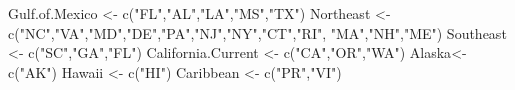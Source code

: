 \documentclass[
]{book}
\newenvironment{Shaded}{\begin{snugshade}}{\end{snugshade}}
\newcommand{\FunctionTok}[1]{\textcolor[rgb]{0.00,0.00,0.00}{#1}}
\newcommand{\NormalTok}[1]{#1}
\newcommand{\OtherTok}[1]{\textcolor[rgb]{0.56,0.35,0.01}{#1}}
\newcommand{\StringTok}[1]{\textcolor[rgb]{0.31,0.60,0.02}{#1}}
\begin{document}
\begin{Shaded}
\begin{Highlighting}[]
\NormalTok{Gulf.of.Mexico }\OtherTok{\textless{}{-}} \FunctionTok{c}\NormalTok{(}\StringTok{"FL"}\NormalTok{,}\StringTok{"AL"}\NormalTok{,}\StringTok{"LA"}\NormalTok{,}\StringTok{"MS"}\NormalTok{,}\StringTok{"TX"}\NormalTok{)}
\NormalTok{Northeast }\OtherTok{\textless{}{-}} \FunctionTok{c}\NormalTok{(}\StringTok{"NC"}\NormalTok{,}\StringTok{"VA"}\NormalTok{,}\StringTok{"MD"}\NormalTok{,}\StringTok{"DE"}\NormalTok{,}\StringTok{"PA"}\NormalTok{,}\StringTok{"NJ"}\NormalTok{,}\StringTok{"NY"}\NormalTok{,}\StringTok{"CT"}\NormalTok{,}\StringTok{"RI"}\NormalTok{,}
               \StringTok{"MA"}\NormalTok{,}\StringTok{"NH"}\NormalTok{,}\StringTok{"ME"}\NormalTok{)}
\NormalTok{Southeast }\OtherTok{\textless{}{-}} \FunctionTok{c}\NormalTok{(}\StringTok{"SC"}\NormalTok{,}\StringTok{"GA"}\NormalTok{,}\StringTok{"FL"}\NormalTok{)}
\NormalTok{California.Current }\OtherTok{\textless{}{-}} \FunctionTok{c}\NormalTok{(}\StringTok{"CA"}\NormalTok{,}\StringTok{"OR"}\NormalTok{,}\StringTok{"WA"}\NormalTok{)}
\NormalTok{Alaska}\OtherTok{\textless{}{-}} \FunctionTok{c}\NormalTok{(}\StringTok{"AK"}\NormalTok{)}
\NormalTok{Hawaii }\OtherTok{\textless{}{-}} \FunctionTok{c}\NormalTok{(}\StringTok{"HI"}\NormalTok{)}
\NormalTok{Caribbean }\OtherTok{\textless{}{-}} \FunctionTok{c}\NormalTok{(}\StringTok{"PR"}\NormalTok{,}\StringTok{"VI"}\NormalTok{)}


\end{Highlighting}
\end{Shaded}
\end{document}
